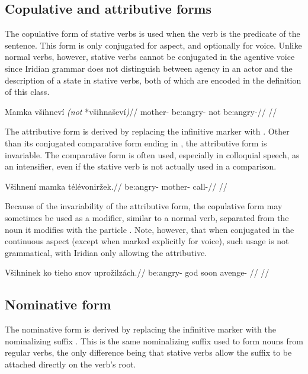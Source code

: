 \subsection{Copulative and attributive forms}
The copulative form of stative verbs is used when the verb is the predicate of the sentence. This form is only conjugated for aspect, and optionally for voice. Unlike normal verbs, however, stative verbs cannot be conjugated in the agentive voice since Iridian grammar does not distinguish between agency in an actor and the description of a state in stative verbs, both of which are encoded in the definition of this class. 

\ex
\begingl
\gla Mamka všihneví \emph{(not} *všihnaševí\emph{)}//
\glb mother- be:angry- not be:angry-//
\glft {}//
\endgl
\xe


The attributive form is derived by replacing the infinitive marker  with . Other than its conjugated comparative form ending in , the attributive form is invariable. The comparative form is often used, especially in colloquial speech, as an intensifier, even if the stative verb is not actually used in a comparison.

\ex
\begingl
\gla Všihnení mamka t\'el\'evoniržek.//
\glb be:angry- mother- call-//
\glft {}//
\endgl
\xe

Because of the invariability of the attributive form, the copulative form may sometimes be used as a modifier, similar to a normal verb, separated from the noun it modifies with the particle . Note, however, that when conjugated in the continuous aspect (except when marked explicitly for voice), such usage is not grammatical, with Iridian only allowing the attributive.

\ex
\begingl
\gla Všihninek ko tieho snov uprožilzách.//
\glb be:angry-  god soon avenge- //
\glft {}//
\endgl
\xe


\subsection{Nominative form}
The nominative form is derived by replacing the infinitive marker  with the nominalizing suffix . This is the same nominalizing suffix used to form nouns from regular verbs, the only difference being that stative verbs allow the suffix to be attached directly on the verb's root.


